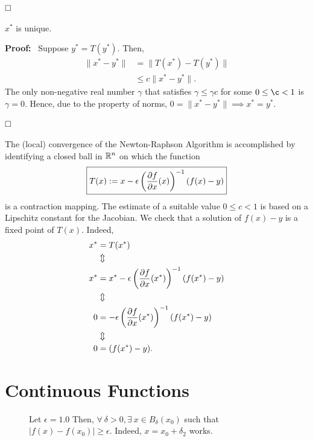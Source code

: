     $\hfill \square$
    
\begin{claim}  $x^\ast$ is unique.
\end{claim}

\textbf{Proof:}~ Suppose $y^\ast=T\left(y^\ast\right)$. Then,
    \begin{align*}
        \|x^\ast-y^\ast\|&=\|T\left(x^\ast\right)- T\left(y^\ast\right)\| \\
        &\leq c \|x^\ast-y^\ast\|.
    \end{align*}
    The only non-negative real number $\gamma $ that satisfies $\gamma \le \gamma c$ for some $0 \le \c < 1$ is $\gamma=0$. Hence, due to the property of norms, $0=\|x^\ast-y^\ast\|\implies x^\ast=y^\ast$. 
    
    $\hfill \square$
    
    \Qed
    
\begin{rem} The (local) convergence of the Newton-Raphson Algorithm is accomplished by identifying a closed ball in $\real^n$ on which the function
 $$\boxed{T(x):= x-\epsilon\left(\pardiff[f]{x}(x)\right)^{-1}(f(x)-y)}$$
 is a contraction mapping. The estimate of a suitable value $0 \le c < 1$ is based on a Lipschitz constant for the Jacobian. We check that 
a solution of $f(x)-y$ is a fixed point of $T(x)$.
Indeed,
\begin{align*}
x^\ast & = T(x^\ast) \\
&\Updownarrow \\
x^\ast&=x^\ast-\epsilon\left(\pardiff[f]{x}(x^\ast)\right)^{-1}(f(x^\ast)-y)\\
&\Updownarrow \\
0&=-\epsilon\left(\pardiff[f]{x}(x^\ast)\right)^{-1}(f(x^\ast)-y)\\
&\Updownarrow \\
0&=(f(x^\ast)-y).
\end{align*}
\end{rem}
  

\section{Continuous Functions}

\begin{figure}[hbt!]%
    \caption[]{Let $\epsilon=1.0$ Then, $\forall~\delta>0, \exists~x\in B_\delta(x_0)$ such that $|f(x) - f(x_0)| \ge \epsilon$. Indeed, $x=x_0 +\delta_2$ works. }
    \label{fig:DiscontFunction}
\end{figure} 

